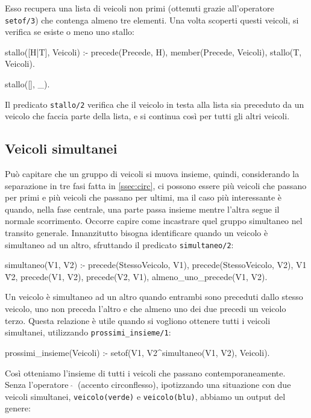Esso recupera una lista di veicoli non primi (ottenuti grazie all'operatore \texttt{setof/3}) che contenga almeno tre elementi. Una volta scoperti questi veicoli, si verifica se esiste o meno uno stallo:
\begin{verbatimtab}
stallo([H|T], Veicoli) :-
	precede(Precede, H),
	member(Precede, Veicoli),
	stallo(T, Veicoli).

stallo([], _).
\end{verbatimtab}

Il predicato \texttt{stallo/2} verifica che il veicolo in testa alla lista sia preceduto da un veicolo che faccia parte della lista, e si continua così per tutti gli altri veicoli.

\subsection{Veicoli simultanei}
Può capitare che un gruppo di veicoli si muova insieme, quindi, considerando la separazione in tre fasi fatta in \ref{ssec:circ}, ci possono essere più veicoli che passano per primi e più veicoli che passano per ultimi, ma il caso più interessante è quando, nella fase centrale, una parte passa insieme mentre l'altra segue il normale scorrimento. Occorre capire come incastrare quel gruppo simultaneo nel transito generale. Innanzitutto bisogna identificare quando un veicolo è simultaneo ad un altro, sfruttando il predicato \texttt{simultaneo/2}:
\begin{verbatimtab}
simultaneo(V1, V2) :-
	precede(StessoVeicolo, V1),
	precede(StessoVeicolo, V2),
	V1 \= V2,
	\+ precede(V1, V2),
	\+ precede(V2, V1),
	almeno_uno_precede(V1, V2).
\end{verbatimtab}

Un veicolo è simultaneo ad un altro quando entrambi sono preceduti dallo stesso veicolo, uno non preceda l'altro e che almeno uno dei due precedi un veicolo terzo. Questa relazione è utile quando si vogliono ottenere tutti i veicoli simultanei, utilizzando \texttt{prossimi\_insieme/1}:
\begin{verbatimtab}
prossimi_insieme(Veicoli) :-
	setof(V1, V2^simultaneo(V1, V2), Veicoli).
\end{verbatimtab}

Così otteniamo l'insieme di tutti i veicoli che passano contemporaneamente. Senza l'operatore $\ \widehat{}\ $ (accento circonflesso), ipotizzando una situazione con due veicoli simultanei, \texttt{veicolo(verde)} e \texttt{veicolo(blu)}, abbiamo un output del genere:

